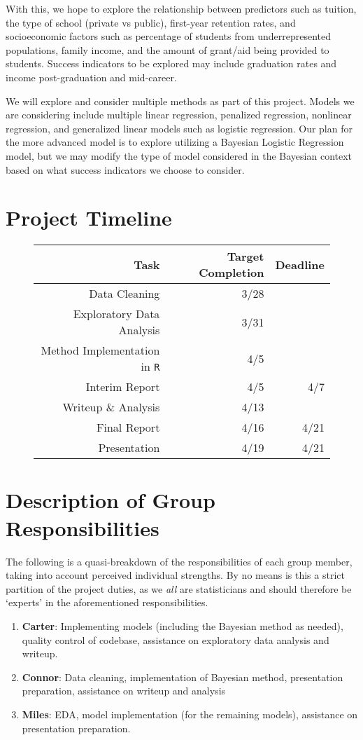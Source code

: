 \documentclass[11pt]{article}   	%
\begin{document}
With this, we hope to explore the relationship between predictors such as tuition, the type of school (private vs public), first-year retention rates, and socioeconomic factors such as percentage of students from underrepresented populations, family income, and the amount of grant/aid being provided to students. Success indicators to be explored may include graduation rates and income post-graduation and mid-career.

We will explore and consider multiple methods as part of this project. Models we are considering include multiple linear regression, penalized regression, nonlinear regression, and generalized linear models such as logistic regression. Our plan for the more advanced model is to explore utilizing a Bayesian Logistic Regression model, but we may modify the type of model considered in the Bayesian context based on what success indicators we choose to consider.

\section{Project Timeline}

\begin{figure}[H]
\centering
\begin{tabular}{rrr}
\toprule
Task & Target Completion & Deadline \\
\midrule
Data Cleaning & 3/28 & \\
Exploratory Data Analysis & 3/31 & \\
Method Implementation in {\tt{R}} & 4/5 & \\
Interim Report & 4/5 & 4/7 \\
Writeup \& Analysis & 4/13 & \\
Final Report & 4/16 & 4/21 \\
Presentation & 4/19 & 4/21 \\
\bottomrule
\end{tabular}
\end{figure}

\section{Description of Group Responsibilities}

The following is a quasi-breakdown of the responsibilities of each group member, taking into account perceived individual strengths. By no means is this a strict partition of the project duties, as we \textit{all} are statisticians and should therefore be `experts' in the aforementioned responsibilities.

\begin{enumerate}
    \item \textbf{Carter}: Implementing models (including the Bayesian method as needed), quality control of codebase, assistance on exploratory data analysis and writeup.
    \item \textbf{Connor}: Data cleaning, implementation of Bayesian method, presentation preparation, assistance on writeup and analysis
    \item \textbf{Miles}: EDA, model implementation (for the remaining models), assistance on presentation preparation.
\end{enumerate}
\end{document}
